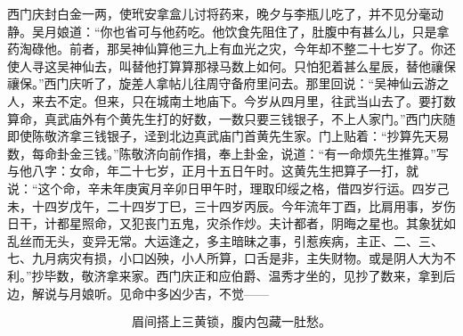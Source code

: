 西门庆封白金一两，使玳安拿盒儿讨将药来，晚夕与李瓶儿吃了，并不见分毫动静。吴月娘道：“你也省可与他药吃。他饮食先阻住了，肚腹中有甚么儿，只是拿药淘碌他。前者，那吴神仙算他三九上有血光之灾，今年却不整二十七岁了。你还使人寻这吴神仙去，叫替他打算算那禄马数上如何。只怕犯着甚么星辰，替他禳保禳保。”西门庆听了，旋差人拿帖儿往周守备府里问去。那里回说：“吴神仙云游之人，来去不定。但来，只在城南土地庙下。今岁从四月里，往武当山去了。要打数算命，真武庙外有个黄先生打的好数，一数只要三钱银子，不上人家门。”西门庆随即使陈敬济拿三钱银子，迳到北边真武庙门首黄先生家。门上贴着：“抄算先天易数，每命卦金三钱。”陈敬济向前作揖，奉上卦金，说道：“有一命烦先生推算。”写与他八字：女命，年二十七岁，正月十五日午时。这黄先生把算子一打，就说：“这个命，辛未年庚寅月辛卯日甲午时，理取印绥之格，借四岁行运。四岁己未，十四岁戊午，二十四岁丁巳，三十四岁丙辰。今年流年丁酉，比肩用事，岁伤日干，计都星照命，又犯丧门五鬼，灾杀作炒。夫计都者，阴晦之星也。其象犹如乱丝而无头，变异无常。大运逢之，多主暗昧之事，引惹疾病，主正、二、三、七、九月病灾有损，小口凶殃，小人所算，口舌是非，主失财物。或是阴人大为不利。”抄毕数，敬济拿来家。西门庆正和应伯爵、温秀才坐的，见抄了数来，拿到后边，解说与月娘听。见命中多凶少吉，不觉——

\[
眉间搭上三黄锁，腹内包藏一肚愁。
\]
